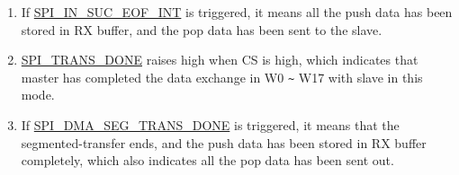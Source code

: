 \documentclass[main\_\_EN.tex]{subfiles}
\begin{document}
\begin{landscape}
\begin{tiplisting}
\vspace{-2em}
\begin{enumerate}

\item If \hyperref[int:SPIINSUCEOFINT]{SPI\_IN\_SUC\_EOF\_INT} is triggered, it means all the push data has been stored in RX buffer, and the pop data has been sent to the slave.\label{spi-note1}

\item \hyperref[fielddesc:SPITRANSDONE]{SPI\_TRANS\_DONE} raises high when CS is high, which indicates that master has completed the data exchange in W0 \verb+~+ W17 with slave in this mode.\label{spi-note2}

\item If \hyperref[fielddesc:SPIDMASEGTRANSDONE]{SPI\_DMA\_SEG\_TRANS\_DONE} is triggered, it means that the segmented-transfer ends, and the push data has been stored in RX buffer completely, which also indicates all the pop data has been sent out. \label{note3}
\end{enumerate}
\end{tiplisting}


\end{landscape}
\end{document}
